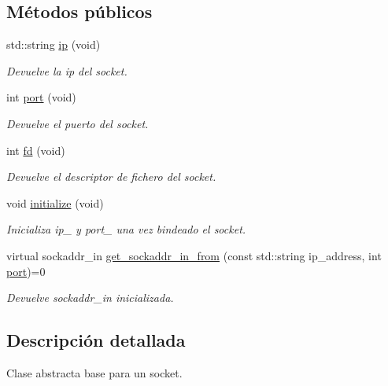 \subsection*{Métodos públicos}
\begin{DoxyCompactItemize}
\item 
std\+::string \hyperlink{classSocket__base_aed490170422026c6dfe5def12031cd04}{ip} (void)
\begin{DoxyCompactList}\small\item\em Devuelve la ip del socket. \end{DoxyCompactList}\item 
int \hyperlink{classSocket__base_afcdd7ae81a9fb867d012b7db8c259576}{port} (void)
\begin{DoxyCompactList}\small\item\em Devuelve el puerto del socket. \end{DoxyCompactList}\item 
\mbox{\label{classSocket__base_a740aedbac3269e4981732dd6842cd9c2}} 
int \hyperlink{classSocket__base_a740aedbac3269e4981732dd6842cd9c2}{fd} (void)
\begin{DoxyCompactList}\small\item\em Devuelve el descriptor de fichero del socket. \end{DoxyCompactList}\item 
void \hyperlink{classSocket__base_af0b9f713f4d6231c287198034fad662e}{initialize} (void)
\begin{DoxyCompactList}\small\item\em Inicializa ip\+\_\+ y port\+\_\+ una vez bindeado el socket. \end{DoxyCompactList}\item 
virtual sockaddr\+\_\+in \hyperlink{classSocket__base_a887249ae6a25693230c0febf403a2545}{get\+\_\+sockaddr\+\_\+in\+\_\+from} (const std\+::string ip\+\_\+address, int \hyperlink{classSocket__base_afcdd7ae81a9fb867d012b7db8c259576}{port})=0
\begin{DoxyCompactList}\small\item\em Devuelve sockaddr\+\_\+in inicializada. \end{DoxyCompactList}\end{DoxyCompactItemize}


\subsection{Descripción detallada}
Clase abstracta base para un socket. 


